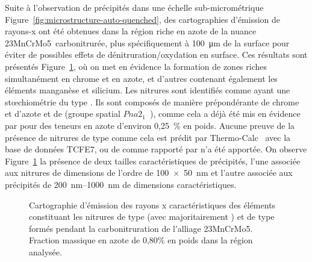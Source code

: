 Suite à l'observation de précipités dans une échelle sub-micrométrique Figure~\ref{fig:microstructure-auto-quenched}, des cartographies d'émission de rayons-x ont été obtenues dans la région riche en azote de la nuance 23MnCrMo5 carbonitrurée, plus spécifiquement à \SI{100}{\micro\metre} de la surface pour éviter de possibles effets de dénitruration/oxydation en surface. Ces résultats sont présentés Figure~\ref{fig:chemical-maps-auto}, où on met en évidence la formation de zones riches simultanément en chrome et en azote, et d'autres contenant également les éléments manganèse et silicium. Les nitrures sont identifiés comme ayant une st{\oe}chiométrie du type . Ils sont composés de manière prépondérante de chrome et d'azote et de  (groupe spatial $Pna2_{1}$~\cite{Weitzer1987178}), comme cela a déjà été mis en évidence par \citet{Catteau2016} pour des teneurs en azote d'environ 0,25~\% en poids. Aucune preuve de la présence de nitrures de type  comme cela est prédit par Thermo-Calc~\cite{Andersson2002,Borgenstam2000} avec la base de données TCFE7, ou de  comme rapporté par \citet{Catteau2016} n'a été apportée. On observe Figure~\ref{fig:chemical-maps-auto} la présence de deux tailles caractéristiques de précipités, l'une associée aux nitrures  de dimensions de l'ordre de \SI{100 x 50}{\nano\metre} et l'autre associée aux précipités  de \SIrange{200}{1000}{\nano\metre} de dimensions caractéristiques.

\begin{figure}[!ht]
  \centering{}
  
  \caption{\label{fig:chemical-maps-auto}Cartographie d'émission des rayons x caractéristiques des éléments constituant les nitrures de type  (avec  majoritairement ) et de type  formés pendant la carbonitruration de l'alliage 23MnCrMo5. Fraction massique en azote de 0,80\% en poids dans la région analysée.}
\end{figure}

